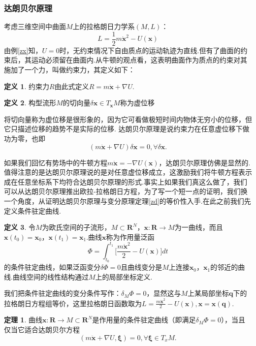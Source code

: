 \documentclass[UTF8,10.5pt,a4paper]{ctexart}
\numberwithin{equation}{section}
\theoremstyle{definition}
\newtheorem{thm}{定理\hspace{0.05pt}}[section]
\theoremstyle{definition}
\newtheorem{dfn}{定义\hspace{0.05pt}}[section]
\begin{document}
\subsubsection{达朗贝尔原理}
\par 考虑三维空间中曲面$M$上的拉格朗日力学系$(M,L)$：
$$L=\frac{1}{2}m\dot{\textbf{x}}^2-U(\textbf{x})$$
由例\ref{zx}知，$U=0$时，无约束情况下自由质点的运动轨迹为直线.但有了曲面的约束后，其运动必须留在曲面内.从牛顿的观点看，这表明曲面作为质点的约束对其施加了一个力，叫做约束力，其定义如下：
\begin{dfn}
约束力$R$由此式定义$R=m\ddot{\textbf{x}}+\nabla U$.
\end{dfn}
\begin{dfn}
构型流形$M$的切向量$\delta\textbf{x}\in T_{\textbf{x}}M$称为虚位移
\end{dfn}
将切向量称为虚位移是很形象的，因为它可看做极短时间内物体无穷小的位移，但它只描述位移的趋势不是实际的位移.
达朗贝尔原理是说约束力在任意虚位移下做功为零，也即
$$(m\ddot{\textbf{x}}+\nabla U)\delta\textbf{x}=0 ,\forall\delta{\textbf{x}}.$$
\par 如果我们回忆有势场中的牛顿方程$m\ddot{\textbf{x}}=-\nabla U(\textbf{x})$，达朗贝尔原理仿佛是显然的.值得注意的是达朗贝尔原理说的是对任意虚位移成立，这激励我们将牛顿方程表示成在任意坐标系下均符合达朗贝尔原理的形式.事实上如果我们真这么做了，我们可以从达朗贝尔原理推出欧拉-拉格朗日方程，为了写一个短一点的证明，我们换一个角度，从证明达朗贝尔原理与变分原理定理\ref{zd}的等价性入手.在此之前我们先定义条件驻定曲线.
\begin{dfn}
令$M$为欧氏空间的子流形，$M\subset \textbf{R}^N$，$\textbf{x}:\mathbf{R}\rightarrow M$为一曲线，而且$\textbf{x}(t_0)=\textbf{x}_0$，$\textbf{x}(t_1)=\textbf{x}_1$.曲线$\textbf{x}$称为作用量泛函
$$\Phi=\int_{t_0}^{t_1}\big[\frac{m\dot{\textbf{x}}^2}{2}-U(\textbf{x})\big]dt$$
的条件驻定曲线，如果泛函变分$\delta\Phi=0$且曲线变分是$M$上连接$\textbf{x}_0$，$\textbf{x}_1$的邻近的曲线.曲线空间的线性结构通过$M$上的局部坐标定义.
\end{dfn}
我们把条件驻定曲线的变分条件写作：$\delta_M\Phi=0$，显然这与$M$上某局部坐标$\textbf{q}$下的拉格朗日方程组等价，这里拉格朗日函数取为$L=\frac{m\dot{\textbf{x}}^2}{2}-U(\textbf{x}), \textbf{x}=\textbf{x}(\textbf{q})$.
\begin{thm}\label{dl}
曲线$\textbf{x}:\textbf{R}\rightarrow M\subset \textbf{R}^N$是作用量的条件驻定曲线（即满足$\delta_M\Phi=0$），当且仅当它适合达朗贝尔方程
$$(m\ddot{\textbf{x}}+\nabla U,\mathbf{\xi})=0,\forall\mathbf{\xi}\in T_xM .$$
\end{thm}
\end{document}
